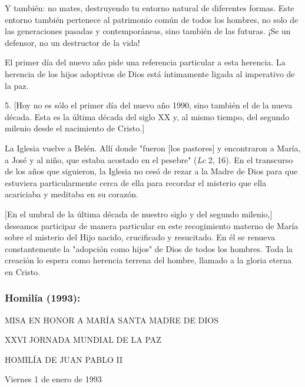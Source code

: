 \begin{body}
Y también: no mates, destruyendo tu entorno natural de diferentes
formas. Este entorno también pertenece al patrimonio común de todos los
hombres, no solo de las generaciones pasadas y contemporáneas, sino
también de las futuras. ¡Se un defensor, no un destructor de la vida!

El primer día del nuevo año pide una referencia particular a esta
herencia. La herencia de los hijos adoptivos de Dios está íntimamente
ligada al imperativo de la paz.

5. {[}Hoy no es sólo el primer día del nuevo año 1990, sino también el
de la nueva década. Esta es la última década del siglo XX y, al mismo
tiempo, del segundo milenio desde el nacimiento de Cristo.{]}

La Iglesia vuelve a Belén. Allí donde "fueron {[}los pastores{]} y
encontraron a María, a José y al niño, que estaba acostado en el
pesebre" (\emph{Lc} 2, 16). En el transcurso de los años que siguieron,
la Iglesia no cesó de rezar a la Madre de Dios para que estuviera
particularmente cerca de ella para recordar el misterio que ella
acariciaba y meditaba en su corazón.

{[}En el umbral de la última década de nuestro siglo y del segundo
milenio,{]} deseamos participar de manera particular en este
recogimiento materno de María sobre el misterio del Hijo nacido,
crucificado y resucitado. En él se renueva constantemente la "adopción
como hijos" de Dios de todos los hombres. Toda la creación lo espera
como herencia terrena del hombre, llamado a la gloria eterna en Cristo.

\subsubsection{Homilía (1993): }
MISA EN HONOR A MARÍA SANTA MADRE DE DIOS

XXVI JORNADA MUNDIAL DE LA PAZ

HOMILÍA DE JUAN PABLO II

Viernes 1 de enero de 1993


\end{body}
